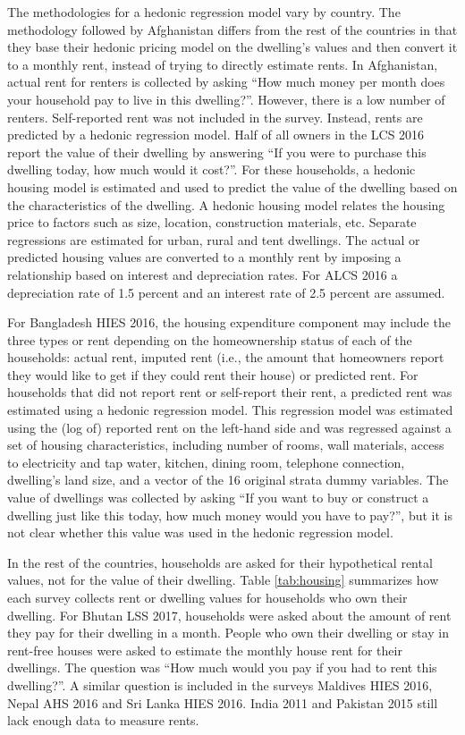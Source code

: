 \documentclass[13 pt,]{book}
\begin{document}
The methodologies for a hedonic regression model vary by country. The
methodology followed by Afghanistan differs from the rest of the
countries in that they base their hedonic pricing model on the
dwelling's values and then convert it to a monthly rent, instead of
trying to directly estimate rents. In Afghanistan, actual rent for
renters is collected by asking ``How much money per month does your
household pay to live in this dwelling?''. However, there is a low
number of renters. Self-reported rent was not included in the survey.
Instead, rents are predicted by a hedonic regression model. Half of all
owners in the LCS 2016 report the value of their dwelling by answering
``If you were to purchase this dwelling today, how much would it
cost?''. For these households, a hedonic housing model is estimated and
used to predict the value of the dwelling based on the characteristics
of the dwelling. A hedonic housing model relates the housing price to
factors such as size, location, construction materials, etc. Separate
regressions are estimated for urban, rural and tent dwellings. The
actual or predicted housing values are converted to a monthly rent by
imposing a relationship based on interest and depreciation rates. For
ALCS 2016 a depreciation rate of 1.5 percent and an interest rate of 2.5
percent are assumed.

For Bangladesh HIES 2016, the housing expenditure component may include
the three types or rent depending on the homeownership status of each of
the households: actual rent, imputed rent (i.e., the amount that
homeowners report they would like to get if they could rent their house)
or predicted rent. For households that did not report rent or
self-report their rent, a predicted rent was estimated using a hedonic
regression model. This regression model was estimated using the (log of)
reported rent on the left-hand side and was regressed against a set of
housing characteristics, including number of rooms, wall materials,
access to electricity and tap water, kitchen, dining room, telephone
connection, dwelling's land size, and a vector of the 16 original strata
dummy variables. The value of dwellings was collected by asking ``If you
want to buy or construct a dwelling just like this today, how much money
would you have to pay?'', but it is not clear whether this value was
used in the hedonic regression model.

In the rest of the countries, households are asked for their
hypothetical rental values, not for the value of their dwelling. Table
\ref{tab:housing} summarizes how each survey collects rent or dwelling
values for households who own their dwelling. For Bhutan LSS 2017,
households were asked about the amount of rent they pay for their
dwelling in a month. People who own their dwelling or stay in rent-free
houses were asked to estimate the monthly house rent for their
dwellings. The question was ``How much would you pay if you had to rent
this dwelling?''. A similar question is included in the surveys Maldives
HIES 2016, Nepal AHS 2016 and Sri Lanka HIES 2016. India 2011 and
Pakistan 2015 still lack enough data to measure rents.
\end{document}
